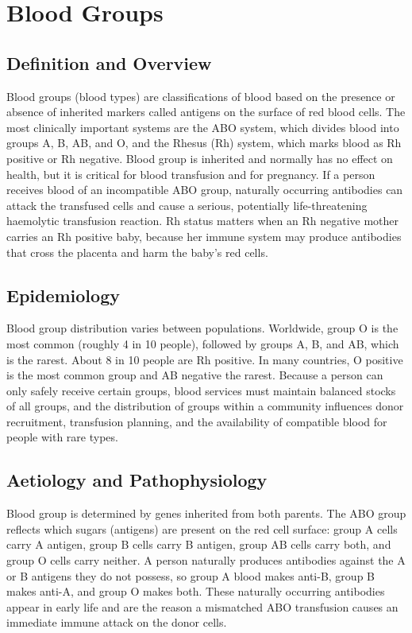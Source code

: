 \chapter{Blood Groups}

\section*{Definition and Overview}
Blood groups (blood types) are classifications of blood based on the presence or absence of inherited markers called antigens on the surface of red blood cells. The most clinically important systems are the ABO system, which divides blood into groups A, B, AB, and O, and the Rhesus (Rh) system, which marks blood as Rh positive or Rh negative. Blood group is inherited and normally has no effect on health, but it is critical for blood transfusion and for pregnancy. If a person receives blood of an incompatible ABO group, naturally occurring antibodies can attack the transfused cells and cause a serious, potentially life-threatening haemolytic transfusion reaction. Rh status matters when an Rh negative mother carries an Rh positive baby, because her immune system may produce antibodies that cross the placenta and harm the baby's red cells.

\section*{Epidemiology}
Blood group distribution varies between populations. Worldwide, group O is the most common (roughly 4 in 10 people), followed by groups A, B, and AB, which is the rarest. About 8 in 10 people are Rh positive. In many countries, O positive is the most common group and AB negative the rarest. Because a person can only safely receive certain groups, blood services must maintain balanced stocks of all groups, and the distribution of groups within a community influences donor recruitment, transfusion planning, and the availability of compatible blood for people with rare types.

\section*{Aetiology and Pathophysiology}
Blood group is determined by genes inherited from both parents. The ABO group reflects which sugars (antigens) are present on the red cell surface: group A cells carry A antigen, group B cells carry B antigen, group AB cells carry both, and group O cells carry neither. A person naturally produces antibodies against the A or B antigens they do not possess, so group A blood makes anti-B, group B makes anti-A, and group O makes both. These naturally occurring antibodies appear in early life and are the reason a mismatched ABO transfusion causes an immediate immune attack on the donor cells.

